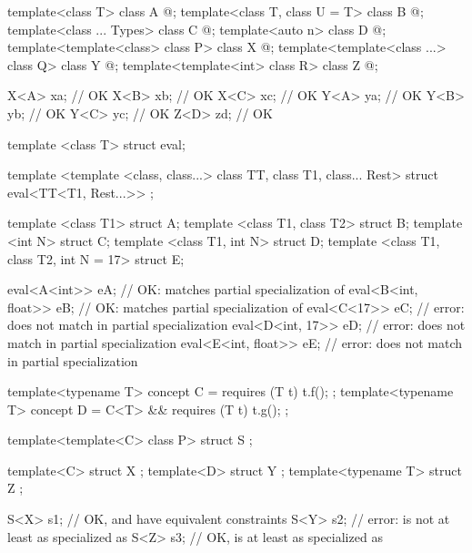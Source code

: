 \begin{example}
\begin{codeblock}
template<class T> class A { @\commentellip@ };
template<class T, class U = T> class B { @\commentellip@ };
template<class ... Types> class C { @\commentellip@ };
template<auto n> class D { @\commentellip@ };
template<template<class> class P> class X { @\commentellip@ };
template<template<class ...> class Q> class Y { @\commentellip@ };
template<template<int> class R> class Z { @\commentellip@ };

X<A> xa;            // OK
X<B> xb;            // OK
X<C> xc;            // OK
Y<A> ya;            // OK
Y<B> yb;            // OK
Y<C> yc;            // OK
Z<D> zd;            // OK
\end{codeblock}
\end{example}
\begin{example}
\begin{codeblock}
template <class T> struct eval;

template <template <class, class...> class TT, class T1, class... Rest>
struct eval<TT<T1, Rest...>> { };

template <class T1> struct A;
template <class T1, class T2> struct B;
template <int N> struct C;
template <class T1, int N> struct D;
template <class T1, class T2, int N = 17> struct E;

eval<A<int>> eA;            // OK: matches partial specialization of 
eval<B<int, float>> eB;     // OK: matches partial specialization of 
eval<C<17>> eC;             // error:  does not match  in partial specialization
eval<D<int, 17>> eD;        // error:  does not match  in partial specialization
eval<E<int, float>> eE;     // error:  does not match  in partial specialization
\end{codeblock}
\end{example}
\begin{example}
\begin{codeblock}
template<typename T> concept C = requires (T t) { t.f(); };
template<typename T> concept D = C<T> && requires (T t) { t.g(); };

template<template<C> class P> struct S { };

template<C> struct X { };
template<D> struct Y { };
template<typename T> struct Z { };

S<X> s1;            // OK,  and  have equivalent constraints
S<Y> s2;            // error:  is not at least as specialized as 
S<Z> s3;            // OK,  is at least as specialized as 
\end{codeblock}
\end{example}

